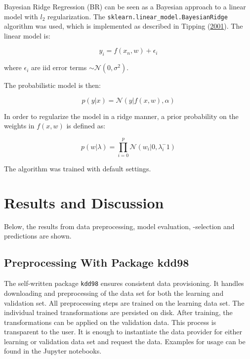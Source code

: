 \documentclass[
  11pt,
  a4paper,
  DIV=12,captions=tableheading,oneside,titlepage]{scrbook}
\begin{document}
Bayesian Ridge Regression (BR) can be seen as a Bayesian approach to a linear model with \(l_2\) regularization. The \texttt{sklearn.linear\_model.BayesianRidge} algorithm was used, which is implemented as described in Tipping (\protect\hyperlink{ref-tipping2001sparse}{2001}). The linear model is:

\begin{equation}
y_i = f(x_n, w) + \epsilon_i
\label{eq:bayesion-linear-model-sk}
\end{equation}

where \(\epsilon_i\) are iid error terms \(\sim \mathcal{N}(0, \sigma^2)\).

The probabilistic model is then:

\begin{equation}
p(y|x) =\mathcal{N}(y|f(x,w), \alpha)
\label{eq:bayesian-prob-model}
\end{equation}

In order to regularize the model in a ridge manner, a prior probability on the weights in \(f(x,w)\) is defined as:

\begin{equation}
p(w|\lambda) = \prod_{i=0}^p \mathcal{N}(w_i|0, \lambda_i^-1)
\label{eq:prior-alpha}
\end{equation}

The algorithm was trained with default settings.

\hypertarget{results-and-discussion}{%
\chapter{Results and Discussion}\label{results-and-discussion}}

Below, the results from data preprocessing, model evaluation, -selection and predictions are shown.

\hypertarget{preprocessing-with-package-kdd98}{%
\section{Preprocessing With Package kdd98}\label{preprocessing-with-package-kdd98}}

The self-written package \texttt{kdd98} ensures consistent data provisioning. It handles downloading and preprocessing of the data set for both the learning and validation set. All preprocessing steps are trained on the learning data set. The individual trained transformations are persisted on disk. After training, the transformations can be applied on the validation data. This process is transparent to the user. It is enough to instantiate the data provider for either learning or validation data set and request the data. Examples for usage can be found in the Jupyter notebooks.
\end{document}
